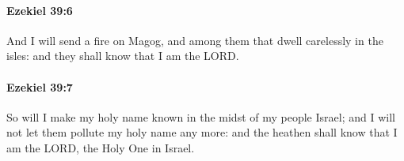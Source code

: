 		\paragraph{Ezekiel 39:6} %
			\label{EZEKIEL-39-6}

			And I will send a fire on Magog, and among them that dwell carelessly in the isles: and they shall know that I am the LORD.


		\paragraph{Ezekiel 39:7} %
			\label{EZEKIEL-39-7}

			So will I make my holy name known in the midst of my people Israel; and I will not let them pollute my holy name any more: and the heathen shall know that I am the LORD, the Holy One in Israel.


